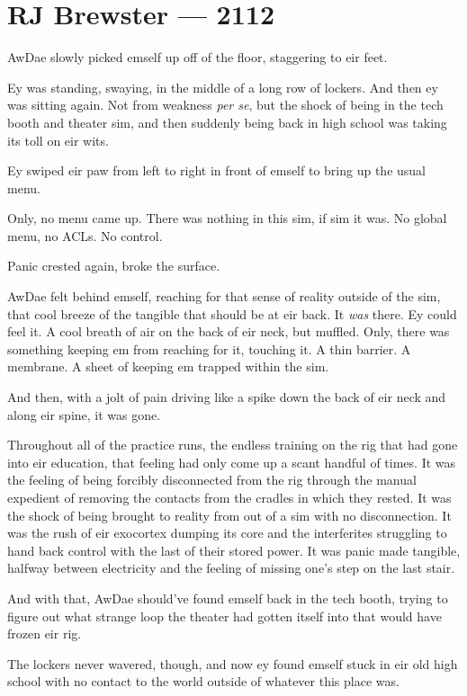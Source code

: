\hypertarget{rj-brewster-2112}{%
\chapter*{RJ Brewster — 2112}\label{rj-brewster-2112}}

AwDae slowly picked emself up off of the floor, staggering to eir feet.

Ey was standing, swaying, in the middle of a long row of lockers. And then ey was sitting again. Not from weakness \emph{per se}, but the shock of being in the tech booth and theater sim, and then suddenly being back in high school was taking its toll on eir wits.

Ey swiped eir paw from left to right in front of emself to bring up the usual menu.

Only, no menu came up. There was nothing in this sim, if sim it was. No global menu, no ACLs. No control.

Panic crested again, broke the surface.

AwDae felt behind emself, reaching for that sense of reality outside of the sim, that cool breeze of the tangible that should be at eir back. It \emph{was} there. Ey could feel it. A cool breath of air on the back of eir neck, but muffled. Only, there was something keeping em from reaching for it, touching it. A thin barrier. A membrane. A sheet of keeping em trapped within the sim.

And then, with a jolt of pain driving like a spike down the back of eir neck and along eir spine, it was gone.

Throughout all of the practice runs, the endless training on the rig that had gone into eir education, that feeling had only come up a scant handful of times. It was the feeling of being forcibly disconnected from the rig through the manual expedient of removing the contacts from the cradles in which they rested. It was the shock of being brought to reality from out of a sim with no disconnection. It was the rush of eir exocortex dumping its core and the interferites struggling to hand back control with the last of their stored power. It was panic made tangible, halfway between electricity and the feeling of missing one's step on the last stair.

And with that, AwDae should've found emself back in the tech booth, trying to figure out what strange loop the theater had gotten itself into that would have frozen eir rig.

The lockers never wavered, though, and now ey found emself stuck in eir old high school with no contact to the world outside of whatever this place was.

